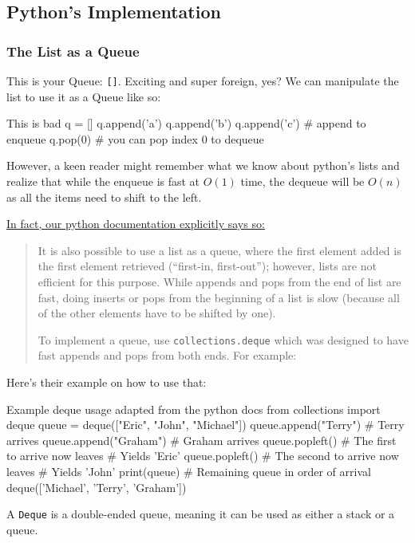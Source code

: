 \subsection{Python's Implementation}


\subsubsection{The List as a Queue}

This is your Queue: \texttt{[]}.  Exciting and super foreign, yes?
We can manipulate the list to use it as a Queue like so:

\begin{pycode}{This is bad}
q = []
q.append('a')
q.append('b')
q.append('c') # append to enqueue
q.pop(0)      # you can pop index 0 to dequeue
\end{pycode}

However, a keen reader might remember what we know about python's lists and realize that while the enqueue is fast at $O(1)$ time, the dequeue will be $O(n)$ as all the items need to shift to the left.  

\href{https://docs.python.org/3/tutorial/datastructures.html#using-lists-as-queues}{In fact, our python documentation explicitly says so:}

\begin{quotation}
It is also possible to use a list as a queue, where the first element added is the first element retrieved (``first-in, first-out''); however, lists are not efficient for this purpose. While appends and pops from the end of list are fast, doing inserts or pops from the beginning of a list is slow (because all of the other elements have to be shifted by one).

To implement a queue, use \texttt{collections.deque} which was designed to have fast appends and pops from both ends. For example:
\end{quotation}


Here's their example on how to use that:
\begin{pycode}{Example deque usage adapted from the python docs}
from collections import deque
queue = deque(["Eric", "John", "Michael"])
queue.append("Terry")           # Terry arrives
queue.append("Graham")          # Graham arrives
queue.popleft()                 # The first to arrive now leaves
								# Yields 'Eric'
queue.popleft()                 # The second to arrive now leaves
                                # Yields 'John'
print(queue)                    # Remaining queue in order of arrival
deque(['Michael', 'Terry', 'Graham'])
\end{pycode}

A \texttt{Deque} is a double-ended queue, meaning it can be used as either a stack or a queue.
